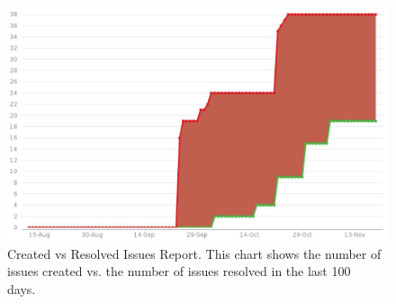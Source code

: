 \documentclass[a4paper,12pt]{book}
\begin{document}
{\begin{figure}[H]
  \centering
    \includegraphics[width=1.0\textwidth]{chart1}
    \caption{Created vs Resolved Issues Report. This chart shows the number of issues created vs. the number of issues resolved in the last 100 days.~\cite{jiraboard}}
\end{figure}
    
}
\end{document}
